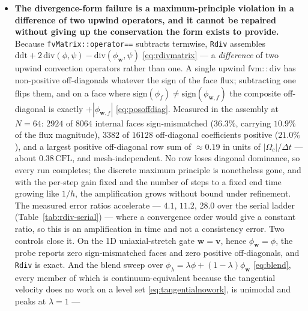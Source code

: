 \documentclass[preprint,3p,11pt]{elsarticle}
\newcommand{\psilev}{\psi}
\begin{document}
\begin{itemize}
    in the \emph{off-diagonals}, which the split leaves untouched by construction
    because they belong to the operator pair and not to $f$
    (Section~\ref{sec:rdiv-mechanism}). The experiment could not have found the
    defect it was aimed at, and the two suspects it left standing have since been
    measured and are bounded and second-order (Table~\ref{tab:rdiv-coefficient}).
  \item \textbf{The divergence-form failure is a maximum-principle violation in a
    difference of two upwind operators, and it cannot be repaired without giving up
    the conservation the form exists to provide.} Because
    \texttt{fvMatrix::operator==} subtracts termwise, \texttt{Rdiv} assembles
    $\mathrm{ddt} + 2\,\mathrm{div}(\phi,\psilev) -
    \mathrm{div}(\phi_{\mathbf{w}},\psilev)$ \eqref{eq:rdivmatrix} --- a
    \emph{difference} of two upwind convection operators rather than one. A single
    upwind $\mathrm{fvm::div}$ has non-positive off-diagonals whatever the sign of
    the face flux; subtracting one flips them, and on a face where
    $\mathrm{sign}(\phi_f) \neq \mathrm{sign}(\phi_{\mathbf{w},f})$ the composite
    off-diagonal is exactly $+|\phi_{\mathbf{w},f}|$ \eqref{eq:posoffdiag}.
    Measured in the assembly at $N=64$: $2924$ of $8064$ internal faces
    sign-mismatched ($36.3\%$, carrying $10.9\%$ of the flux magnitude), $3382$ of
    $16128$ off-diagonal coefficients positive ($21.0\%$), and a largest positive
    off-diagonal row sum of $\approx 0.19$ in units of $|\Omega_c|/\Delta t$ ---
    about $0.38\,\mathrm{CFL}$, and mesh-independent. No row loses diagonal
    dominance, so every run completes; the discrete maximum principle is
    nonetheless gone, and with the per-step gain fixed and the number of steps to a
    fixed end time growing like $1/h$, the amplification grows without bound under
    refinement. The measured error ratios accelerate --- $4.1$, $11.2$, $28.0$ over
    the serial ladder (Table~\ref{tab:rdiv-serial}) --- where a convergence order
    would give a constant ratio, so this is an amplification in time and not a
    consistency error. Two controls close it. On the 1D uniaxial-stretch gate
    $\mathbf{w} = \mathbf{v}$, hence $\phi_{\mathbf{w}} = \phi$, the probe reports
    zero sign-mismatched faces and zero positive off-diagonals, and \texttt{Rdiv}
    is exact. And the blend sweep over $\phi_\lambda = \lambda\phi +
    (1-\lambda)\phi_{\mathbf{w}}$ \eqref{eq:blend}, every member of which is
    continuum-equivalent because the tangential velocity does no work on a level
    set \eqref{eq:tangentialnowork}, is unimodal and peaks at $\lambda = 1$ ---

\end{itemize}
\end{document}
